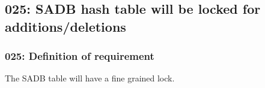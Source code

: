 \subsection{025: SADB hash table will be locked for additions/deletions}

\subsubsection{025: Definition of requirement }

The SADB table will have a fine grained lock.




